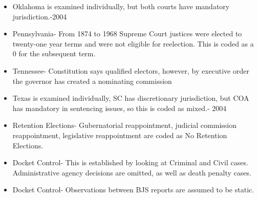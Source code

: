 \documentclass[12pt]{article}
\begin{document}
\begin{itemize}
	\item Oklahoma is examined individually, but both courts have mandatory jurisdiction.-2004
	
	\item Pennsylvania- From 1874 to 1968 Supreme Court justices were elected to twenty-one year terms and were not eligible for reelection.  This is coded as a 0 for the subsequent term.
	
	\item Tennessee- Constitution says qualified electors, however, by executive order the governor has created a nominating commission
	
	\item Texas is examined individually, SC has discretionary jurisdiction, but COA has mandatory in sentencing issues, so this is coded as mixed.- 2004
	
	\item Retention Elections- Gubernatorial reappointment, judicial commission reappointment, legislative reappointment are coded as No Retention Elections.
	
	\item Docket Control- This is established by looking at Criminal and Civil cases.  Administrative agency decisions are omitted, as well as death penalty cases.
	
	\item Docket Control- Observations between BJS reports are assumed to be static.
\end{itemize}
\end{document}
